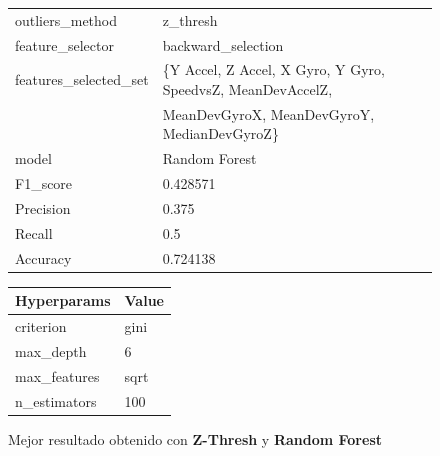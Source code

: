 \begin{appendices}
		\begin{figure}[htb]
			\centering
			\begin{tabular}{ll}
				\toprule
					  outliers\_method &                                           z\_thresh \\
					 feature\_selector &                                 backward\_selection \\
				features\_selected\_set &  \{Y Accel, Z Accel, X Gyro, Y Gyro, SpeedvsZ, MeanDevAccelZ,\\
										& MeanDevGyroX, MeanDevGyroY, MedianDevGyroZ\}\\
								model &                                      Random Forest \\
							 F1\_score &                                           0.428571 \\
							Precision &                                              0.375 \\
							   Recall &                                                0.5 \\
							 Accuracy &                                           0.724138 \\
				\bottomrule
			\end{tabular}
			\newline
			\newline
			
			\begin{tabular}{ll}
				\toprule
				 Hyperparams & Value \\
				\midrule
				   criterion &  gini \\
				   max\_depth &     6 \\
				max\_features &  sqrt \\
				n\_estimators &   100 \\
				\bottomrule
			\end{tabular}
			\caption{Mejor resultado obtenido con \textbf{Z-Thresh} y \textbf{Random Forest}}
			\label{table:33}
		\end{figure}
		
		\begin{figure}[htb]
			\centering


\end{figure}
\end{appendices}
